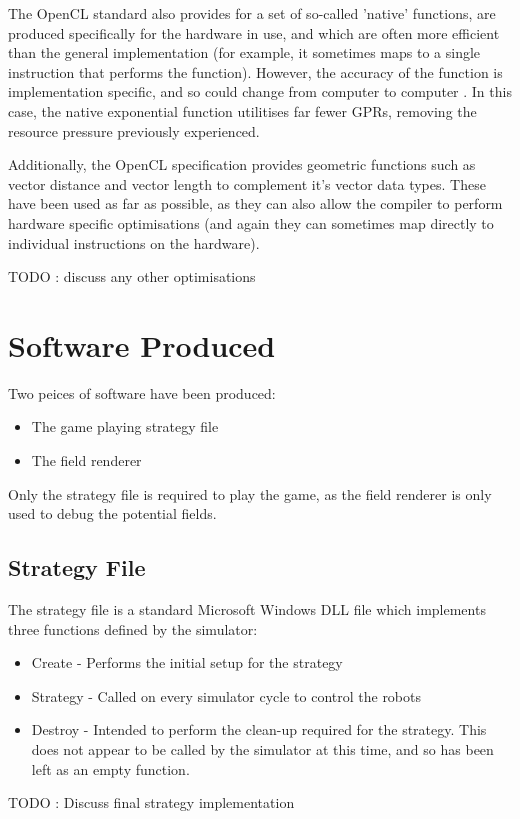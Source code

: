 \documentclass[10pt]{article}
\begin{document}
The OpenCL standard also provides for a set of so-called 'native' functions, are produced specifically for the hardware in use, and which are often more efficient than the general implementation (for example, it sometimes maps to a single instruction that performs the function). However, the accuracy of the function is implementation specific, and so could change from computer to computer \cite{openCl11Spec}. In this case, the native exponential function utilitises far fewer \acp{GPR}, removing the resource pressure previously experienced.

Additionally, the OpenCL specification provides geometric functions such as vector distance and vector length to complement it's vector data types. These have been used as far as possible, as they can also allow the compiler to perform hardware specific optimisations (and again they can sometimes map directly to individual instructions on the hardware).\cite{openCl11Spec}

TODO : discuss any other optimisations

\section{Software Produced}

Two peices of software have been produced:
\begin{itemize}
\item The game playing strategy file
\item The field renderer
\end{itemize}
Only the strategy file is required to play the game, as the field renderer is only used to debug the potential fields.

\subsection{Strategy File}

The strategy file is a standard Microsoft Windows \ac{DLL} file which implements three functions defined by the simulator:
\begin{itemize}
\item Create - Performs the initial setup for the strategy
\item Strategy - Called on every simulator cycle to control the robots
\item Destroy - Intended to perform the clean-up required for the strategy.
This does not appear to be called by the simulator at this time, and so has been left as an empty function.
\end{itemize}
TODO : Discuss final strategy implementation
\end{document}
